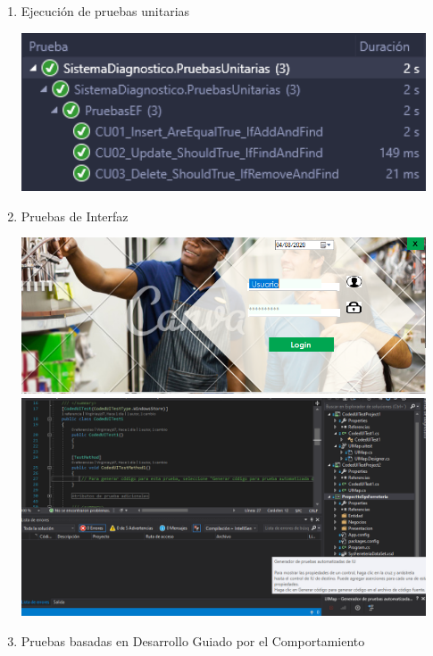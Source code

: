 \documentclass[preprint,12pt]{elsarticle}
\begin{document}
\begin{enumerate}
\item Ejecución de pruebas unitarias

\begin{center}
	\includegraphics[width=12cm]{./imagen/Screenshot_2.png}
	\end{center}

\item  Pruebas de Interfaz 

\begin{center}
	\includegraphics[width=12cm]{./imagen/interface} 
	\includegraphics[width=12cm]{./imagen/f} 
	\end{center}
	
\item Pruebas basadas en Desarrollo Guiado por el Comportamiento
\end{enumerate}
\end{document}
